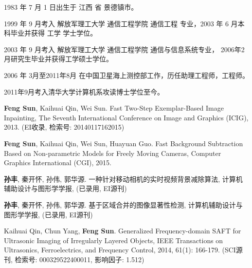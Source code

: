 \begin{resume}


  1983 年 7 月 1 日出生于 江西 省 景德镇市。

  1999 年 9 月考入 解放军理工大学 通信工程学院  通信工程 专业，2003 年 6 月本科毕业并获得 工学 学士学位。

  2003 年 9 月考入 解放军理工大学 通信工程学院 通信与信息系统专业， 2006年2月研究生毕业并获得工学硕士学位。

  2006 年 3月至2011年8月 在中国卫星海上测控部工作，历任助理工程师，工程师。

  2011年9月考入清华大学计算机系攻读博士学位至今。




  \begin{publications}
    \item {\bf Feng Sun}, Kaihuai Qin, Wei Sun. Fast Two-Step Exemplar-Based Image Inpainting,
   The Seventh International Conference on Image and Graphics (ICIG), 2013. (EI收录, 检索号: 20140117162015)
    \item  {\bf Feng Sun}, Kaihuai Qin, Wei Sun, Huayuan Guo. Fast Background Subtraction Based on Non-parametric Models for Freely Moving Cameras,
    Computer Graphics International (CGI), 2015.
  \end{publications}

  \begin{publications}[before=\publicationskip,after=\publicationskip]
    \item {\bf 孙丰}, 秦开怀, 孙伟, 郭华源. 一种针对移动相机的实时视频背景减除算法, 计算机辅助设计与图形学学报, (已录用, EI源刊)
    \item {\bf 孙丰}, 秦开怀, 孙伟, 郭华源. 基于区域合并的图像显著性检测, 计算机辅助设计与图形学学报, (已录用, EI源刊)
  \end{publications}

  \begin{publications}
    \item  Kaihuai Qin, Chun Yang, {\bf Feng Sun}. Generalized Frequency-domain SAFT for Ultrasonic Imaging of Irregularly Layered Objects,
    IEEE Transactions on Ultrasonics, Ferroelectrics, and Frequency Control, 2014, 61(1): 166-179. (SCI源刊, 检索号: 000329522400011, 影响因子: 1.512)





\end{publications}
\end{resume}
